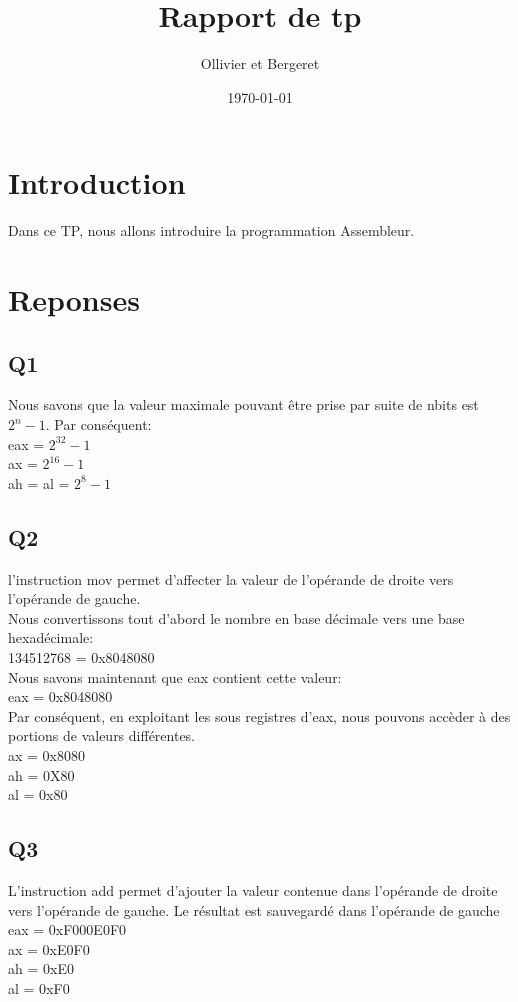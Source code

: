 \documentclass[a4paper]{article}
\title{Rapport de tp}
\author{Ollivier et Bergeret}
\date{\today}
\begin{document}
\maketitle

\newpage

\section{Introduction}

Dans ce TP, nous allons introduire la programmation Assembleur.

\section{Reponses}
\subsection{Q1} 
Nous savons que la valeur maximale pouvant être prise par suite de nbits est $2^{n}-1$. Par conséquent:\\
eax = $2^{32}-1$\\
ax = $2^{16}-1$\\
ah = al = $2^{8}-1$\\

\subsection{Q2}
l'instruction mov permet d'affecter la valeur de l'opérande de droite vers l'opérande de gauche.\\

Nous convertissons tout d'abord le nombre en base décimale vers une base hexadécimale:\\
134512768 = 0x8048080\\
Nous savons maintenant que eax contient cette valeur:\\
eax = 0x8048080\\
Par conséquent, en exploitant les sous registres d'eax, nous pouvons accèder à des portions de valeurs différentes.\\
ax = 0x8080\\
ah = 0X80\\
al = 0x80\\

\subsection{Q3}
L'instruction add permet d'ajouter la valeur contenue dans l'opérande de droite vers l'opérande de gauche. Le résultat est sauvegardé dans l'opérande de gauche\\
eax = 0xF000E0F0\\
ax = 0xE0F0\\
ah = 0xE0\\
al = 0xF0\\
\end{document}
